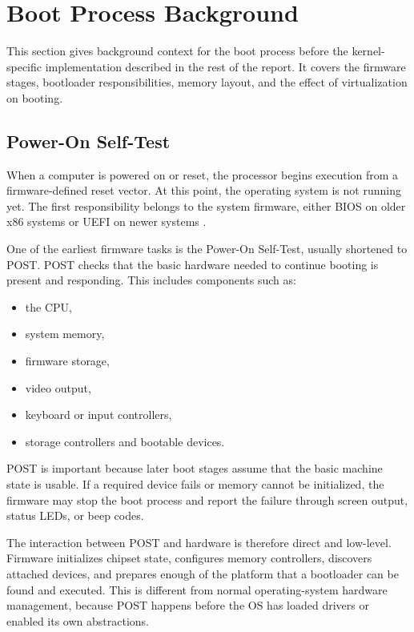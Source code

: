 \section{Boot Process Background}

This section gives background context for the boot process before the kernel-specific implementation described in the rest of the report. It covers the firmware stages, bootloader responsibilities, memory layout, and the effect of virtualization on booting.

\subsection{Power-On Self-Test}
When a computer is powered on or reset, the processor begins execution from a firmware-defined reset vector. At this point, the operating system is not running yet. The first responsibility belongs to the system firmware, either BIOS on older x86 systems or UEFI on newer systems \cite{osdevBootSequence,uefiSpecifications}.

One of the earliest firmware tasks is the Power-On Self-Test, usually shortened to POST. POST checks that the basic hardware needed to continue booting is present and responding. This includes components such as:
\begin{itemize}
  \item the CPU,
  \item system memory,
  \item firmware storage,
  \item video output,
  \item keyboard or input controllers,
  \item storage controllers and bootable devices.
\end{itemize}

POST is important because later boot stages assume that the basic machine state is usable. If a required device fails or memory cannot be initialized, the firmware may stop the boot process and report the failure through screen output, status LEDs, or beep codes.

The interaction between POST and hardware is therefore direct and low-level. Firmware initializes chipset state, configures memory controllers, discovers attached devices, and prepares enough of the platform that a bootloader can be found and executed. This is different from normal operating-system hardware management, because POST happens before the OS has loaded drivers or enabled its own abstractions.

